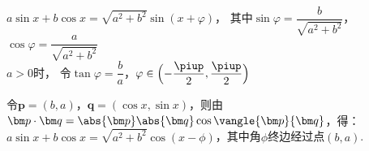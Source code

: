\begin{description}[leftmargin=0pt,labelsep=0pt]
      \item%
        \begin{itemizeMy}
          \item $a\sin x+b\cos x=\sqrt{a^2+b^2}\sin(x+\varphi)$，
            其中$\sin\varphi=\dfrac{b}{\sqrt{a^2+b^2}}$，$\cos\varphi=\dfrac{a}{\sqrt{a^2+b^2}}$\\
            $a>0$时，
            令$\tan\varphi=\dfrac{b}a$，$
            \varphi\in\Bigl(-\dfrac{\piup}2,\dfrac{\piup}2\Bigr)$
          \item 令$\bm p=(b,a)$，$\bm q=(\cos x,\sin x)$，则由$\bm p\cdot\bm q=\abs{\bm p}\abs{\bm q} \cos\vangle{\bm p}{\bm q}$，得：\\
          $a\sin x+b\cos x=\sqrt{a^2+b^2}\cos{(x-\phi)}$，其中角$\phi$终边经过点$(b,a)$.
        \end{itemizeMy}
  \end{description}
